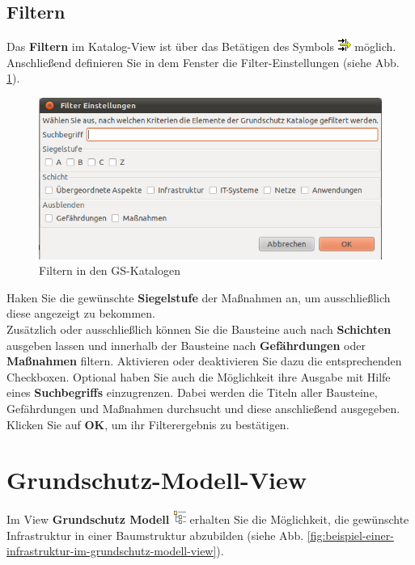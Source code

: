 \documentclass[a4paper,10pt]{book}
\begin{document}
\subsection{Filtern}
Das \textbf{Filtern} im Katalog-View ist über das Betätigen des Symbols \includegraphics[height=2ex]{Icon/Filter.png} möglich.
Anschließend definieren Sie in dem Fenster die Filter-Einstellungen (siehe Abb. \ref{Filtern der GS-Kataloge}).
\newline
\begin{figure}[htb!]
  \centering
  \includegraphics[scale=.5]{Screenshot/Filtern_kataloge.png}
  \caption{\label{Filtern der GS-Kataloge} Filtern in den GS-Katalogen}
\end{figure}
\newline
Haken Sie die gewünschte \textbf{Siegelstufe} der Maßnahmen an, um ausschließlich diese angezeigt zu bekommen.
\newline\\
Zusätzlich oder ausschließlich können Sie die Bausteine auch nach \textbf{Schichten} ausgeben lassen und innerhalb der Bausteine nach \textbf{Gefährdungen}
oder \textbf{Maßnahmen} filtern. Aktivieren oder deaktivieren Sie dazu die entsprechenden Checkboxen. Optional haben Sie auch die Möglichkeit ihre
Ausgabe mit Hilfe eines \textbf{Suchbegriffs} einzugrenzen. Dabei werden die Titeln aller Bausteine, Gefährdungen und Maßnahmen durchsucht
und diese anschließend ausgegeben. Klicken Sie auf \textbf{OK}, um ihr Filterergebnis zu bestätigen.

\section{Grundschutz-Modell-View}

Im View \textbf{Grundschutz Modell}
\includegraphics[height=2ex]{Icon/GS_Modell.png} erhalten Sie die
Möglichkeit, die gewünschte Infrastruktur in einer Baumstruktur
abzubilden (siehe
Abb. \ref{fig:beispiel-einer-infrastruktur-im-grundschutz-modell-view}).
\end{document}
